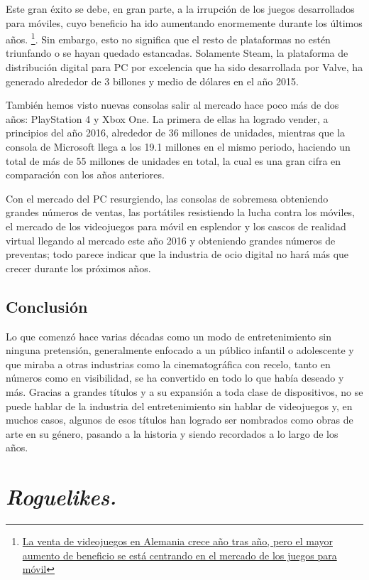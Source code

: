 Este gran éxito se debe, en gran parte, a la irrupción de los juegos desarrollados para móviles, cuyo beneficio ha ido aumentando enormemente durante los últimos años. \footnote{\href{http://goo.gl/Lz9UAa}{La venta de videojuegos en Alemania crece año tras año, pero el mayor aumento de beneficio se está centrando en el mercado de los juegos para móvil}}. Sin embargo, esto no significa que el resto de plataformas no estén triunfando o se hayan quedado estancadas. Solamente Steam, la plataforma de distribución digital para PC por excelencia que ha sido desarrollada por Valve, ha generado alrededor de 3 billones y medio de dólares en el año 2015\cite{website:steamgamesmarket}.

También hemos visto nuevas consolas salir al mercado hace poco más de dos años: PlayStation 4 y Xbox One. La primera de ellas ha logrado vender, a principios del año 2016, alrededor de 36 millones de unidades\cite{website:ps4sales}, mientras que la consola de Microsoft llega a los 19.1 millones en el mismo periodo\cite{xboxonesales}, haciendo un total de más de 55 millones de unidades en total, la cual es una gran cifra en comparación con los años anteriores.

Con el mercado del PC resurgiendo, las consolas de sobremesa obteniendo grandes números de ventas, las portátiles resistiendo la lucha contra los móviles, el mercado de los videojuegos para móvil en esplendor y los cascos de realidad virtual llegando al mercado este año 2016 y obteniendo grandes números de preventas; todo parece indicar que la industria de ocio digital no hará más que crecer durante los próximos años.

\subsection{Conclusión}

Lo que comenzó hace varias décadas como un modo de entretenimiento sin ninguna pretensión, generalmente enfocado a un público infantil o adolescente y que miraba a otras industrias como la cinematográfica con recelo, tanto en números como en visibilidad, se ha convertido en todo lo que había deseado y más. Gracias a grandes títulos y a su expansión a toda clase de dispositivos, no se puede hablar de la industria del entretenimiento sin hablar de videojuegos y, en muchos casos, algunos de esos títulos han logrado ser nombrados como obras de arte en su género, pasando a la historia y siendo recordados a lo largo de los años.

\section{\textit{Roguelikes.}}
\label{sec:roguelikeinformacion}

